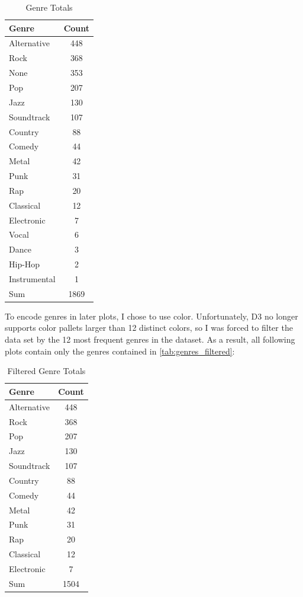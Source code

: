 \documentclass[journal]{vgtc}                %
\begin{document}
\begin{table}[h]
  \caption{Genre Totals}
  \label{tab:genres}
  \scriptsize%
	\centering%
  \begin{tabu}{l c}
  \toprule
    Genre & Count \\
  \midrule
    Alternative & 448 \\
    Rock & 368 \\
    None & 353 \\
    Pop & 207 \\
    Jazz & 130 \\
    Soundtrack & 107 \\
    Country & 88 \\
    Comedy & 44 \\
    Metal & 42 \\
    Punk & 31 \\
    Rap & 20 \\
    Classical & 12 \\
    Electronic & 7 \\
    Vocal & 6 \\
    Dance & 3 \\
    Hip-Hop & 2 \\
    Instrumental & 1 \\
  \midrule
    Sum & 1869 \\
  \bottomrule
  \end{tabu}%
\end{table}

To encode genres in later plots, I chose to use color. Unfortunately, D3 no
longer supports color pallets larger than 12 distinct colors, so I was forced
to filter the data set by the 12 most frequent genres in the dataset. As a
result, all following plots contain only the genres contained in
\autoref{tab:genres_filtered}:

\begin{table}[h]
  \caption{Filtered Genre Totals}
  \label{tab:genres_filtered}
  \scriptsize%
	\centering%
  \begin{tabu}{l c}
  \toprule
    Genre & Count \\
  \midrule
    Alternative & 448 \\
    Rock & 368 \\
    Pop & 207 \\
    Jazz & 130 \\
    Soundtrack & 107 \\
    Country & 88 \\
    Comedy & 44 \\
    Metal & 42 \\
    Punk & 31 \\
    Rap & 20 \\
    Classical & 12 \\
    Electronic & 7 \\
  \midrule
    Sum & 1504 \\
  \bottomrule
  \end{tabu}%
\end{table}
\end{document}
